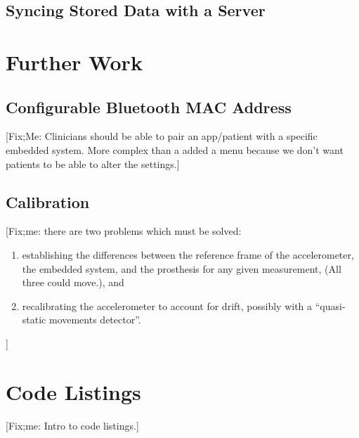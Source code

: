 \documentclass[11pt, a4paper, oneside, english]{scrbook}
\begin{document}
\section{Syncing Stored Data with a Server} %
\label{sec:syncing_stored_data_with_a_server}

\chapter{Further Work} %
\label{cha:further_work}
\section{Configurable Bluetooth MAC Address} %
\label{sec:configurable_bluetooth_mac_adress}
[Fix;Me: Clinicians should be able to pair an app/patient with a specific embedded system. More complex than a added a menu because we don't want patients to be able to alter the settings.]
\section{Calibration} %
\label{sec:calibration}
[Fix;me: there are two problems which must be solved:
\begin{enumerate}
\item establishing the differences between the reference frame of the accelerometer, the embedded system, and the prosthesis for any given measurement, (All three could move.), and
\item recalibrating the accelerometer to account for drift, possibly with a ``quasi-static movements detector''.
\end{enumerate}]
\chapter{Code Listings} %
\label{cha:code_listings}
[Fix;me: Intro to code listings.]
\end{document}
